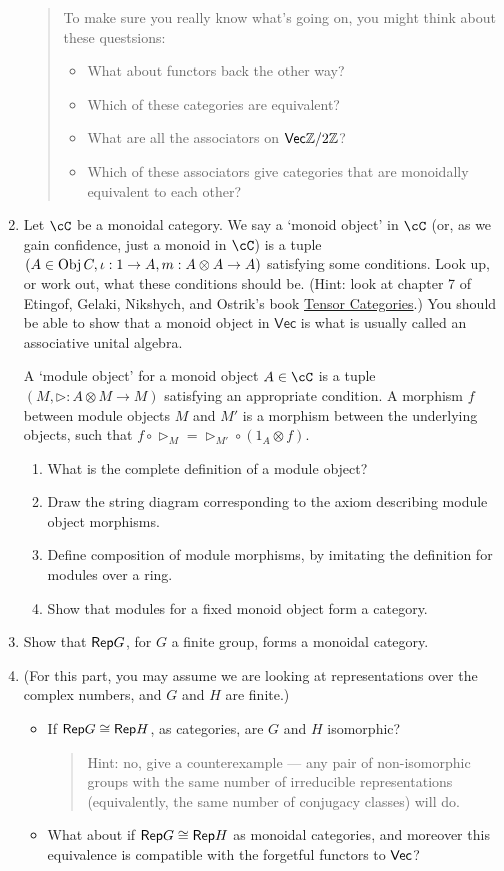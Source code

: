 \documentclass[12pt]{amsart}
\begin{document}
\begin{enumerate}
\begin{quote}
To make sure you really know what's going on, you might think about these questsions:
\begin{itemize}
\item What about functors back the other way?
\item Which of these categories are equivalent?
\item What are all the associators on $\Vec \mathbb Z / 2 \mathbb Z$?
\item Which of these associators give categories that are monoidally equivalent to each other?
\end{itemize}
\end{quote}

\item Let $\cC$ be a monoidal category. We say a `monoid object' in $\cC$ (or, as we gain confidence, just a monoid in $\cC$) is a tuple $(A \in \Obj C, \iota: 1 \to A, m: A \otimes A \to A)$ satisfying some conditions. Look up, or work out, what these conditions should be. (Hint: look at chapter 7 of Etingof, Gelaki, Nikshych, and Ostrik's book \href{http://www-math.mit.edu/~etingof/egnobookfinal.pdf}{Tensor Categories}.) You should be able to show that a monoid object in $\mathsf{Vec}$ is what is usually called an associative unital algebra.

A `module object' for a monoid object $A \in \cC$ is a tuple $(M, \triangleright: A \otimes M \to M)$ satisfying an appropriate condition. A morphism $f$ between module objects $M$ and $M'$ is a morphism between the underlying objects, such that $f \circ \triangleright_M = \triangleright_{M'} \circ (1_A \otimes f)$.
\begin{enumerate}
\item What is the complete definition of a module object?
\item Draw the string diagram corresponding to the axiom describing module object morphisms.
\item Define composition of module morphisms, by imitating the definition for modules over a ring.
\item Show that modules for a fixed monoid object form a category.
\end{enumerate}
\item Show that $\Rep G$, for $G$ a finite group, forms a monoidal category.
\item (For this part, you may assume we are looking at representations over the complex numbers, and $G$ and $H$ are finite.)
\begin{itemize}
\item If $\Rep G \cong \Rep H$, as categories, are $G$ and $H$ isomorphic?
\begin{quote}
\scriptsize
Hint: no, give a counterexample --- any pair of non-isomorphic groups with the same number of irreducible representations (equivalently, the same number of conjugacy classes) will do.
\end{quote}
\item
What about if $\Rep G \cong \Rep H$ as monoidal categories, and moreover this equivalence is compatible with the forgetful functors to $\Vec$?
\begin{quote}
\scriptsize


\end{quote}
\end{itemize}
\end{enumerate}
\end{document}
